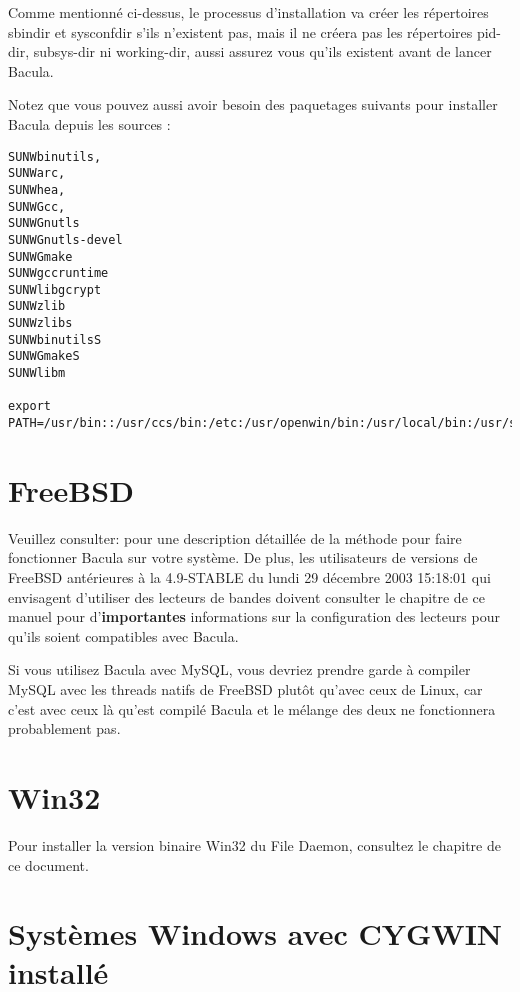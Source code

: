 {{{{{{Comme mentionn\'e ci-dessus, le processus d'installation va cr\'eer les
r\'epertoires sbindir et sysconfdir s'ils n'existent pas, mais il ne cr\'eera
pas les r\'epertoires pid-dir, subsys-dir ni working-dir, aussi assurez vous
qu'ils existent avant de lancer Bacula. 

Notez que vous pouvez aussi avoir besoin des paquetages suivants pour installer Bacula 
depuis les sources :
\footnotesize
\begin{verbatim}
SUNWbinutils,
SUNWarc,
SUNWhea,
SUNWGcc,
SUNWGnutls
SUNWGnutls-devel
SUNWGmake
SUNWgccruntime
SUNWlibgcrypt
SUNWzlib
SUNWzlibs
SUNWbinutilsS
SUNWGmakeS
SUNWlibm

export
PATH=/usr/bin::/usr/ccs/bin:/etc:/usr/openwin/bin:/usr/local/bin:/usr/sfw/bin:/opt/sfw/bin:/usr/ucb:/usr/sbin
\end{verbatim}
\normalsize


\section{FreeBSD}

Veuillez consulter: 
 pour une
description d\'etaill\'ee de la m\'ethode pour faire fonctionner Bacula sur
votre syst\`eme. De plus, les utilisateurs de versions de FreeBSD
ant\'erieures \`a la 4.9-STABLE du lundi 29 d\'ecembre 2003 15:18:01 qui
envisagent d'utiliser des lecteurs de bandes doivent consulter le chapitre 
 de ce
manuel pour d'{\bf importantes} informations sur la configuration des lecteurs
pour qu'ils soient compatibles avec Bacula. 

Si vous utilisez Bacula avec MySQL, vous devriez prendre garde \`a compiler
MySQL avec les threads natifs de FreeBSD plut\^ot qu'avec ceux de Linux, car
c'est avec ceux l\`a qu'est compil\'e Bacula et le m\'elange des deux ne
fonctionnera probablement pas. 

\section{Win32}

Pour installer la version binaire Win32 du File Daemon, consultez le chapitre 
 de ce
document. 

\section{Syst\`emes Windows avec CYGWIN install\'e}
\label{Win32}

}}}}}}
